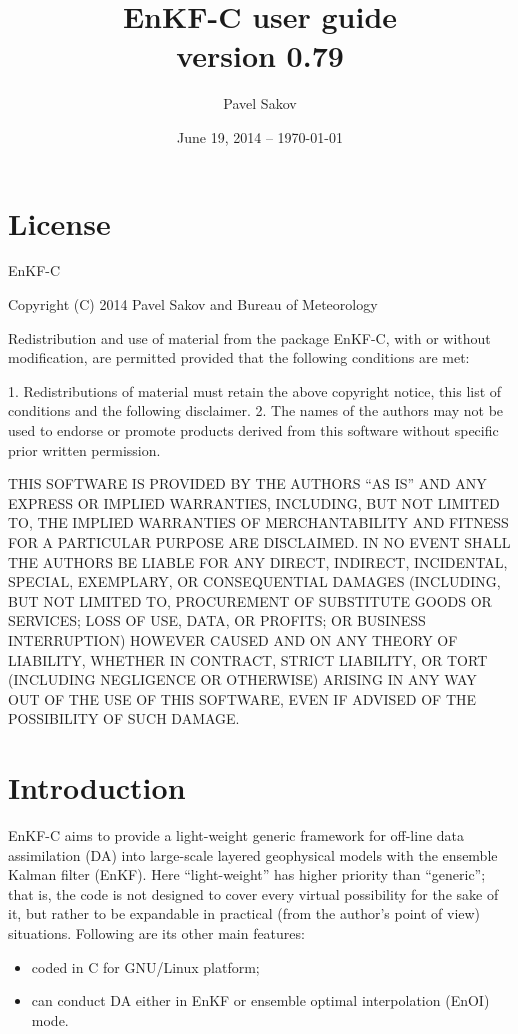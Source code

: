 \documentclass[11pt]{report}
\begin{document}
\title{EnKF-C user guide\\{\normalsize version 0.79}}

\author{Pavel Sakov}
\date{June 19, 2014 -- \today}

\maketitle
\thispagestyle{empty}

\clearpage

\tableofcontents

\clearpage

\chapter*{License}

EnKF-C

Copyright (C) 2014 Pavel Sakov and Bureau of Meteorology

Redistribution and use of material from the package EnKF-C, with or without
modification, are permitted provided that the following conditions are 
met:

   1. Redistributions of material must retain the above copyright notice, this
      list of conditions and the following disclaimer.
   2. The names of the authors may not be used to endorse or promote products
      derived from this software without specific prior written permission.

THIS SOFTWARE IS PROVIDED BY THE AUTHORS ``AS IS'' AND ANY EXPRESS OR IMPLIED 
WARRANTIES, INCLUDING, BUT NOT LIMITED TO, THE IMPLIED WARRANTIES OF
MERCHANTABILITY AND FITNESS FOR A PARTICULAR PURPOSE ARE DISCLAIMED. IN NO
EVENT SHALL THE AUTHORS BE LIABLE FOR ANY DIRECT, INDIRECT, INCIDENTAL, SPECIAL,
EXEMPLARY, OR CONSEQUENTIAL DAMAGES (INCLUDING, BUT NOT LIMITED TO, PROCUREMENT
OF SUBSTITUTE GOODS OR SERVICES; LOSS OF USE, DATA, OR PROFITS; OR BUSINESS
INTERRUPTION) HOWEVER CAUSED AND ON ANY THEORY OF LIABILITY, WHETHER IN
CONTRACT, STRICT LIABILITY, OR TORT (INCLUDING NEGLIGENCE OR OTHERWISE) ARISING
IN ANY WAY OUT OF THE USE OF THIS SOFTWARE, EVEN IF ADVISED OF THE POSSIBILITY
OF SUCH DAMAGE.

\chapter{Introduction}

EnKF-C aims to provide a light-weight generic framework for off-line data assimilation (DA) into large-scale layered geophysical models with the ensemble Kalman filter (EnKF).
Here ``light-weight'' has higher priority than ``generic''; that is, the code is not designed to cover every virtual possibility for the sake of it, but rather to be expandable in practical (from the author's point of view) situations.
Following are its other main features:
\begin{itemize}
\item coded in C for GNU/Linux platform;
\item can conduct DA either in EnKF or ensemble optimal interpolation (EnOI) mode.
\end{itemize}
\end{document}
